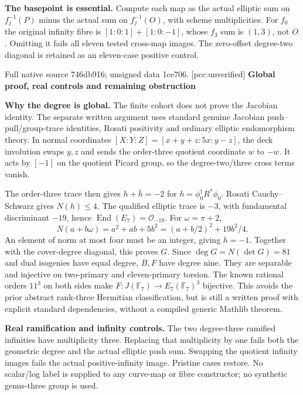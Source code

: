 \documentclass[10pt,a4paper]{article}
\begin{document}
\textbf{The basepoint is essential.} Compute each map as the actual elliptic
sum on $f_j^{-1}(P)$ minus the actual sum on $f_j^{-1}(O)$, with scheme
multiplicities. For $f_0$ the original infinity fibre is
$[1:0:1]+[1:0:-1]$, whose $f_3$ sum is $(1,3)$, not $O$.
Omitting it fails all eleven tested cross-map images. The zero-offset
degree-two diagonal is retained as an eleven-case positive control.

Full native source 746db916; unsigned data 1ce706. [pcc:unverified]
\newpage
{\Large\bfseries Global proof, real controls and remaining obstruction}\par

\textbf{Why the degree is global.} The finite cohort does not prove the
Jacobian identity. The separate written argument uses standard genuine
Jacobian push--pull/group-trace identities, Rosati positivity and ordinary
elliptic endomorphism theory. In normal coordinates
$[X:Y:Z]=[x+y+z:5x:y-z]$, the deck involution swaps $y,z$ and sends
the order-three quotient coordinate $w$ to $-w$. It acts by $[-1]$ on
the quotient Picard group, so the degree-two/three cross terms vanish.

The order-three trace then gives $h+\bar h=-2$ for
$h=\phi_0^\dagger R^*\phi_0$. Rosati Cauchy--Schwarz gives
$N(h)\le4$. The qualified elliptic trace is $-3$, with fundamental
discriminant $-19$, hence $\operatorname{End}(E_7)=\mathcal O_{-19}$.
For $\omega=\pi+2$,
\[
 N(a+b\omega)=a^2+ab+5b^2=(a+b/2)^2+19b^2/4.
\]
An element of norm at most four must be an integer, giving $h=-1$.
Together with the cover-degree diagonal, this proves $G$. Since
$\deg G=N(\det G)=81$ and dual isogenies have equal degree, $B,F$
have degree nine. They are separable and injective on two-primary and
eleven-primary torsion. The known rational orders $11^3$ on both sides
make $F:J(\mathbb F_7)\to E_7(\mathbb F_7)^3$ bijective.
This avoids the prior abstract rank-three Hermitian classification,
but is still a written proof with explicit standard dependencies,
without a compiled generic Mathlib theorem.

\textbf{Real ramification and infinity controls.} The two degree-three
ramified infinities have multiplicity three. Replacing that multiplicity
by one fails both the geometric degree and the actual elliptic push sum.
Swapping the quotient infinity images fails the actual positive-infinity
image. Pristine cases restore. No scalar/log label is supplied to any
curve-map or fibre constructor; no synthetic genus-three group is used.
\end{document}
